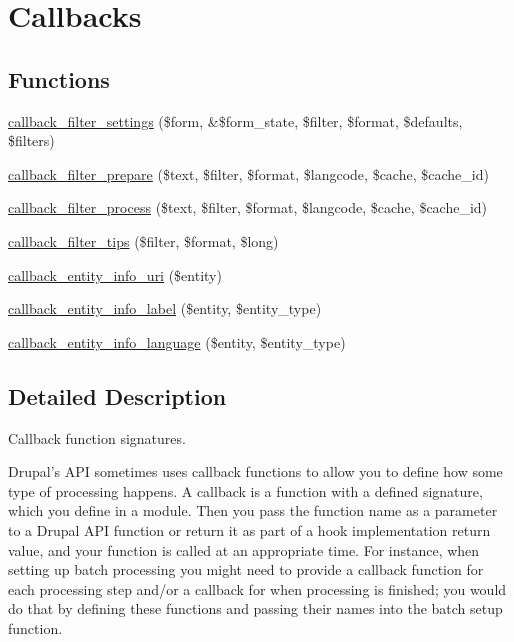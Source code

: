 \hypertarget{group__callbacks}{
\section{Callbacks}
\label{group__callbacks}
}
\subsection*{Functions}
\begin{DoxyCompactItemize}
\item 
\hyperlink{group__callbacks_gac9ccfeb3980f8eaa8b3717e98a1e48e2}{callback\_\-filter\_\-settings} (\$form, \&\$form\_\-state, \$filter, \$format, \$defaults, \$filters)
\item 
\hyperlink{group__callbacks_ga28144a42933a1bd6c183e758583f1039}{callback\_\-filter\_\-prepare} (\$text, \$filter, \$format, \$langcode, \$cache, \$cache\_\-id)
\item 
\hyperlink{group__callbacks_ga5f82accd878d144a22ea2dfec253f91d}{callback\_\-filter\_\-process} (\$text, \$filter, \$format, \$langcode, \$cache, \$cache\_\-id)
\item 
\hyperlink{group__callbacks_gabe5ee7c795e0adac0bccb8061006949e}{callback\_\-filter\_\-tips} (\$filter, \$format, \$long)
\item 
\hyperlink{group__callbacks_ga42bf4e69ee32b2bc99d0d774d4917254}{callback\_\-entity\_\-info\_\-uri} (\$entity)
\item 
\hyperlink{group__callbacks_gae9464157712e8322955f45a671a8403d}{callback\_\-entity\_\-info\_\-label} (\$entity, \$entity\_\-type)
\item 
\hyperlink{group__callbacks_ga6e4c07daa3660701139f60cd79bb3665}{callback\_\-entity\_\-info\_\-language} (\$entity, \$entity\_\-type)
\end{DoxyCompactItemize}


\subsection{Detailed Description}
Callback function signatures.

Drupal's API sometimes uses callback functions to allow you to define how some type of processing happens. A callback is a function with a defined signature, which you define in a module. Then you pass the function name as a parameter to a Drupal API function or return it as part of a hook implementation return value, and your function is called at an appropriate time. For instance, when setting up batch processing you might need to provide a callback function for each processing step and/or a callback for when processing is finished; you would do that by defining these functions and passing their names into the batch setup function.

